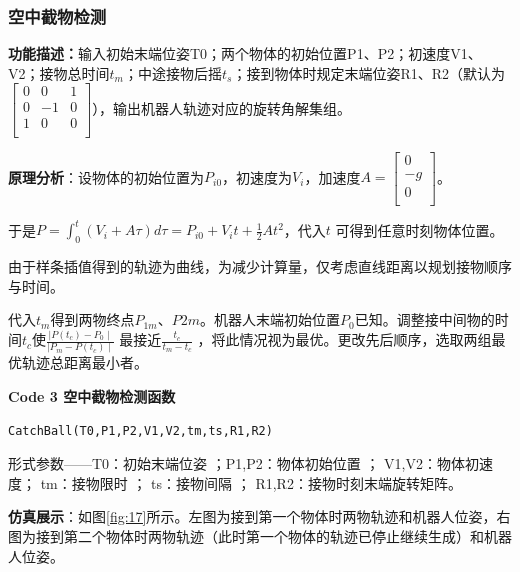 \subsubsection{空中截物检测}
\textbf{功能描述：}输入初始末端位姿T0；两个物体的初始位置P1、P2；初速度V1、V2；接物总时间$t_m$；中途接物后摇$t_s$；接到物体时规定末端位姿R1、R2（默认为$\left[\begin{matrix}0&0&1\\0&-1&0\\1&0&0\\\end{matrix}\right]$），输出机器人轨迹对应的旋转角解集组。

\textbf{原理分析}：设物体的初始位置为$P_{i0}$，初速度为$V_i$，加速度$A=\left[\begin{matrix}0\\-g\\0\\\end{matrix}\right]$。

于是$P=\int_{0}^{t}\left(V_i+A\tau\right)d\tau=P_{i0}+V_it+\frac{1}{2}At^2$，代入$ t$ 可得到任意时刻物体位置。

由于样条插值得到的轨迹为曲线，为减少计算量，仅考虑直线距离以规划接物顺序与时间。

代入$t_m$得到两物终点$P_{1m}$、$P2m$。机器人末端初始位置$P_0$已知。调整接中间物的时间$ t_c$使$\frac{\mid P\left(t_c\right)-P_0\mid}{\mid P_m-P\left(t_c\right)\mid}$ 最接近$\frac{t_c}{t_m-t_c}$ ，将此情况视为最优。更改先后顺序，选取两组最优轨迹总距离最小者。

\textbf{Code 3 {\quad} 空中截物检测函数}
\begin{lstlisting}
CatchBall(T0,P1,P2,V1,V2,tm,ts,R1,R2)
\end{lstlisting}

形式参数——T0：初始末端位姿 ；P1,P2：物体初始位置 ；
V1,V2：物体初速度； tm：接物限时 ；
ts：接物间隔  ；    R1,R2：接物时刻末端旋转矩阵。


\textbf{仿真展示}：如图\ref{fig:17}所示。左图为接到第一个物体时两物轨迹和机器人位姿，右图为接到第二个物体时两物轨迹（此时第一个物体的轨迹已停止继续生成）和机器人位姿。

